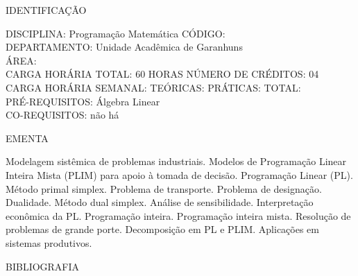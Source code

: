 \documentclass[
	12pt,				%
	openright,			%
  oneside,     %
	a4paper,			%
	english,			%
	french,				%
	spanish,			%
	brazil				%
	]{abntex2}
\begin{document}
\begin{apendicesenv}
\newpage IDENTIFICAÇÃO

DISCIPLINA: Programação Matemática CÓDIGO:\\
DEPARTAMENTO: Unidade Acadêmica de Garanhuns\\
ÁREA: \\
CARGA HORÁRIA TOTAL: 60 HORAS NÚMERO DE CRÉDITOS: 04\\
CARGA HORÁRIA SEMANAL: TEÓRICAS: PRÁTICAS: TOTAL: \\
PRÉ-REQUISITOS: Álgebra Linear \\
CO-REQUISITOS: não há

EMENTA 

Modelagem sistêmica de problemas industriais. Modelos de Programação Linear Inteira Mista (PLIM) para apoio à tomada de decisão. Programação Linear (PL). Método primal simplex. Problema de transporte. Problema de designação. Dualidade. Método dual simplex. Análise de sensibilidade. Interpretação econômica da PL. Programação inteira. Programação inteira mista. Resolução de problemas de grande porte. Decomposição em PL e PLIM. Aplicações em sistemas produtivos.

BIBLIOGRAFIA 


\end{apendicesenv}
\end{document}
